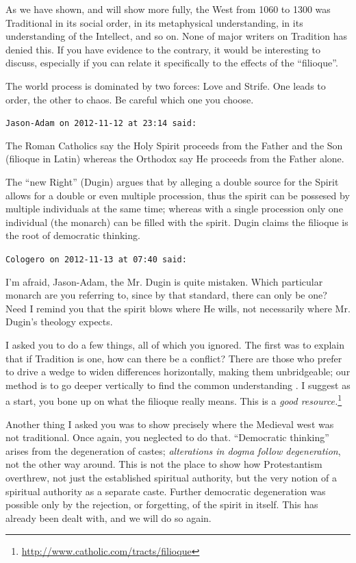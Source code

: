 \begin{footnotesize}
\begin{sffamily}
As we have shown, and will show more fully, the West from 1060 to 1300 was Traditional in its social order, in its metaphysical understanding, in its understanding of the Intellect, and so on. None of major writers on Tradition has denied this. If you have evidence to the contrary, it would be interesting to discuss, especially if you can relate it specifically to the effects of the ``filioque''.

The world process is dominated by two forces: Love and Strife. One leads to order, the other to chaos. Be careful which one you choose.

\hfill

\texttt{Jason-Adam on 2012-11-12 at 23:14 said:}

The Roman Catholics say the Holy Spirit proceeds from the Father and the Son (filioque in Latin) whereas the Orthodox say He proceeds from the Father alone.

The ``new Right'' (Dugin) argues that by alleging a double source for the Spirit allows for a double or even multiple procession, thus the spirit can be possesed by multiple individuals at the same time; whereas with a single procession only one individual (the monarch) can be filled with the spirit. Dugin claims the filioque is the root of democratic thinking.

\hfill

\texttt{Cologero on 2012-11-13 at 07:40 said:}

I'm afraid, Jason-Adam, the Mr. Dugin is quite mistaken. Which particular monarch are you referring to, since by that standard, there can only be one? Need I remind you that the spirit blows where He wills, not necessarily where Mr. Dugin's theology expects.

I asked you to do a few things, all of which you ignored. The first was to explain that if Tradition is one, how can there be a conflict? There are those who prefer to drive a wedge to widen differences horizontally, making them unbridgeable; our method is to go deeper vertically to find the common understanding . I suggest as a start, you bone up on what the filioque really means. This is a \textit{good resource.}\footnote{\url{http://www.catholic.com/tracts/filioque}}


Another thing I asked you was to show precisely where the Medieval west was not traditional. Once again, you neglected to do that. ``Democratic thinking'' arises from the degeneration of castes; \emph{alterations in dogma follow degeneration}, not the other way around. This is not the place to show how Protestantism overthrew, not just the established spiritual authority, but the very notion of a spiritual authority as a separate caste. Further democratic degeneration was possible only by the rejection, or forgetting, of the spirit in itself. This has already been dealt with, and we will do so again.


\end{sffamily}
\end{footnotesize}

